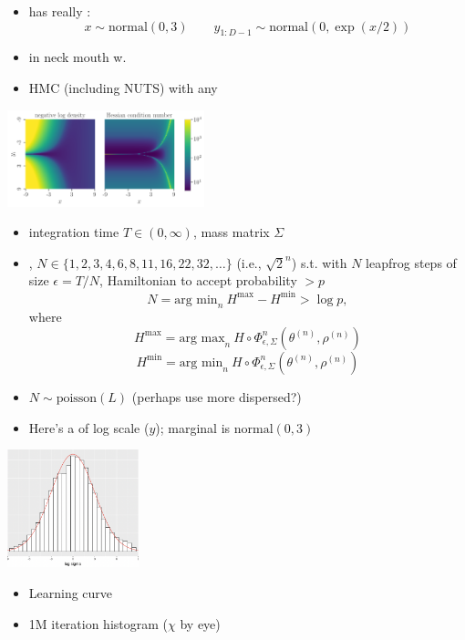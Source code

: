 \documentclass[10pt]{report}
\newcommand{\pos}[2]{#1^{(#2)}}
\begin{document}
\begin{itemize}
\item {} has really :
$$
    x \sim \textrm{normal}(0, 3)
\qquad
y_{1:D-1} \sim \textrm{normal}(0, \exp(x / 2))
$$
\item {} in neck  mouth w. 
\item HMC (including NUTS) with any 
\end{itemize}
\begin{center}
  \includegraphics[width=2.25in]{img/funnel_density_hessian.png}
\end{center}

\begin{itemize}
\item {} integration time $T \in (0, \infty)$, mass matrix $\Sigma$
\item {},  $N \in \{ 1, 2, 3, 4, 6, 
  8, 11, 16, 22, 32, \ldots \}$ (i.e., $\sqrt{2}^n$) s.t. with $N$ leapfrog 
  steps of size $\epsilon = T / N$, Hamiltonian 
  to accept probability $ > p$
  $$
  N = \textrm{arg min}_n \ H^{\textrm{max}} - H^{\textrm{min}} > \log p, 
  $$
  where 
  $$
  H^{\textrm{max}} = \textrm{arg max}_n \ H \circ \Phi^{n}_{\epsilon,\Sigma}(\pos{\theta}{n}, \pos{\rho}{n}) 
  $$
  $$
  H^{\textrm{min}} = \textrm{arg min}_n \ H \circ \Phi^{n}_{\epsilon,\Sigma}(\pos{\theta}{n}, \pos{\rho}{n}) 
  $$
\item {} $N \sim \textrm{poisson}(L)$ \hfill (perhaps use
  more dispersed?)
\end{itemize}

\begin{itemize}
\item Here's a  of log scale ($y$); marginal is $\textrm{normal}(0, 3)$
\end{itemize}
\begin{center}
\includegraphics[width=1.5in]{img/funnel-step-size-GIST.png}
\end{center}
\begin{itemize}
\item Learning curve 
\item 1M iteration histogram  ($\chi$ by eye)
\end{itemize}
\end{document}
